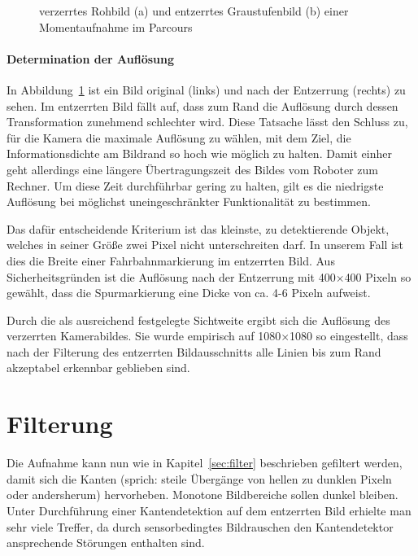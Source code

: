 \begin{figure}[htbp] %
  \centering
  \hfill
  \caption{verzerrtes Rohbild (a) und entzerrtes Graustufenbild (b) einer Momentaufnahme im Parcours}
\label{fig:bildvorverarbeitung_entzerren}
\end{figure} 

\paragraph{Determination der Auflösung}
In Abbildung~\ref{fig:bildvorverarbeitung_entzerren} ist ein Bild original (links) und nach der Entzerrung (rechts) zu sehen. Im entzerrten Bild fällt auf, dass zum Rand die Auflösung durch dessen Transformation zunehmend schlechter wird. Diese Tatsache lässt den Schluss zu, für die Kamera die maximale Auflösung zu wählen, mit dem Ziel, die Informationsdichte am Bildrand so hoch wie möglich zu halten. Damit einher geht allerdings eine längere Übertragungszeit des Bildes vom Roboter zum Rechner. Um diese Zeit durchführbar gering zu halten, gilt es die niedrigste Auflösung bei möglichst uneingeschränkter Funktionalität zu bestimmen. 

Das dafür entscheidende Kriterium ist das kleinste, zu detektierende Objekt, welches in seiner Größe zwei Pixel nicht unterschreiten darf. In unserem Fall ist dies die Breite einer Fahrbahnmarkierung im entzerrten Bild. Aus Sicherheitsgründen ist die Auflösung nach der Entzerrung mit 400\( \times \)400 Pixeln so gewählt, dass die Spurmarkierung eine Dicke von ca. 4-6 Pixeln aufweist. 

Durch die als ausreichend festgelegte Sichtweite ergibt sich die Auflösung des verzerrten Kamerabildes. Sie wurde empirisch auf 1080\( \times \)1080 so eingestellt, dass nach der Filterung des entzerrten Bildausschnitts alle Linien bis zum Rand akzeptabel erkennbar geblieben sind.

\section{Filterung \dcfirstauthorshort}
\label{sec:bildvorverarbeitung:filterung}
Die Aufnahme kann nun wie in Kapitel~\ref{sec:filter} beschrieben gefiltert werden, damit sich die Kanten (sprich: steile Übergänge von hellen zu dunklen Pixeln oder andersherum) hervorheben. Monotone Bildbereiche sollen dunkel bleiben. Unter Durchführung einer Kantendetektion auf dem entzerrten Bild erhielte man sehr viele Treffer, da durch sensorbedingtes Bildrauschen den Kantendetektor ansprechende Störungen enthalten sind. 

